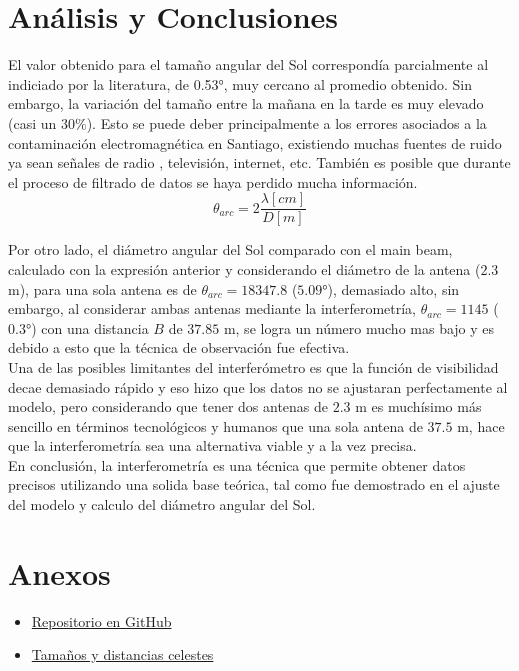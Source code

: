 \documentclass[letterpaper,oneside]{article}
\begin{document}
\section{Análisis y Conclusiones}
El valor obtenido para el tamaño angular del Sol correspondía parcialmente al indiciado por la literatura, de 0.53°, muy cercano al promedio obtenido. Sin embargo, la variación del tamaño entre la mañana en la tarde es muy elevado (casi un $30\%$). Esto se puede deber principalmente a los errores asociados a la contaminación electromagnética en Santiago, existiendo muchas fuentes de ruido ya sean señales de radio , televisión, internet, etc. También es posible que durante el proceso de filtrado de datos se haya perdido mucha información.\\

$$\theta_{arc} = 2 \frac{\lambda [cm]}{D [m]}$$

Por otro lado, el diámetro angular del Sol comparado con el main beam, calculado con la expresión anterior y considerando el diámetro de la antena ($2.3$ m), para una sola antena es de $\theta_{arc} = 18347.8$ ($5.09$°), demasiado alto, sin embargo, al considerar ambas antenas mediante la interferometría, $\theta_{arc} = 1145$ ($0.3$°) con una distancia $B$ de $37.85$ m, se logra un número mucho mas bajo y es debido a esto que la técnica de observación fue efectiva.\\

Una de las posibles limitantes del interferómetro es que la función de visibilidad decae demasiado rápido y eso hizo que los datos no se ajustaran perfectamente al modelo, pero considerando que tener dos antenas de $2.3$ m es muchísimo más sencillo en términos tecnológicos y humanos que una sola antena de $37.5$ m, hace que la interferometría sea una alternativa viable y a la vez precisa.\\

En conclusión, la interferometría es una técnica que permite obtener datos precisos utilizando una solida base teórica, tal como fue demostrado en el ajuste del modelo y calculo del diámetro angular del Sol.\\


\section{Anexos}
\begin{itemize}
  \item \href{https://github.com/vecheto/astro_experimental/tree/main/Tarea\%204}{Repositorio en GitHub}
  \item \href{https://www.matem.unam.mx/~barot/clases/2012-2/24medicion.pdf}{Tamaños y distancias celestes}
\end{itemize} 
 
\end{document}
